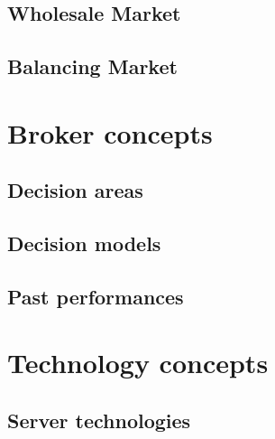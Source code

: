 \subsection{Wholesale Market}
\subsection{Balancing Market}

\section{Broker concepts}
\subsection{Decision areas}
\subsection{Decision models}
\subsection{Past performances}

\section{Technology concepts}
\subsection{Server technologies}


